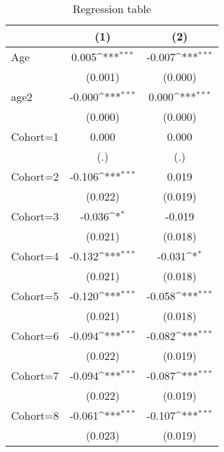 \begin{table}[htbp]\centering
\def\sym#1{\ifmmode^{#1}\else\(^{#1}\)\fi}
\caption{Regression table \label{reg3}}
\begin{tabular}{l*{2}{c}}
\toprule
                    &\multicolumn{1}{c}{(1)}         &\multicolumn{1}{c}{(2)}         \\
\midrule
Age                 &       0.005\sym{***}&      -0.007\sym{***}\\
                    &     (0.001)         &     (0.000)         \\
\addlinespace
age2                &      -0.000\sym{***}&       0.000\sym{***}\\
                    &     (0.000)         &     (0.000)         \\
\addlinespace
Cohort=1            &       0.000         &       0.000         \\
                    &         (.)         &         (.)         \\
\addlinespace
Cohort=2            &      -0.106\sym{***}&       0.019         \\
                    &     (0.022)         &     (0.019)         \\
\addlinespace
Cohort=3            &      -0.036\sym{*}  &      -0.019         \\
                    &     (0.021)         &     (0.018)         \\
\addlinespace
Cohort=4            &      -0.132\sym{***}&      -0.031\sym{*}  \\
                    &     (0.021)         &     (0.018)         \\
\addlinespace
Cohort=5            &      -0.120\sym{***}&      -0.058\sym{***}\\
                    &     (0.021)         &     (0.018)         \\
\addlinespace
Cohort=6            &      -0.094\sym{***}&      -0.082\sym{***}\\
                    &     (0.022)         &     (0.019)         \\
\addlinespace
Cohort=7            &      -0.094\sym{***}&      -0.087\sym{***}\\
                    &     (0.022)         &     (0.019)         \\
\addlinespace
Cohort=8            &      -0.061\sym{***}&      -0.107\sym{***}\\
                    &     (0.023)         &     (0.019)         \\

\end{tabular}
\end{table}
